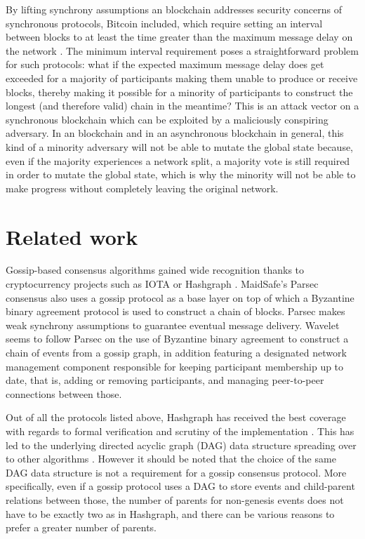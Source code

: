 \documentclass[a4paper,11pt]{article}
\begin{document}
By lifting synchrony assumptions an blockchain addresses security concerns of synchronous
protocols, Bitcoin included, which require setting an interval between blocks to at least the time
greater than the maximum message delay on the network \cite{rethinking}. The minimum interval
requirement poses a straightforward problem for such protocols: what if the expected maximum message
delay does get exceeded for a majority of participants making them unable to produce or receive
blocks, thereby making it possible for a minority of participants to construct the longest (and
therefore valid) chain in the meantime? This is an attack vector on a synchronous blockchain which
can be exploited by a maliciously conspiring adversary. In an blockchain and in an
asynchronous blockchain in general, this kind of a minority adversary will not be able to mutate the
global state because, even if the majority experiences a network split, a majority vote is still
required in order to mutate the global state, which is why the minority will not be able to make
progress without completely leaving the original network.


\section{Related work}

Gossip-based consensus algorithms gained wide recognition thanks to cryptocurrency projects such as
IOTA or Hashgraph \cite{hashgraph}. MaidSafe's Parsec \cite{parsec} consensus also uses a gossip
protocol as a base layer on top of which a Byzantine binary agreement protocol is used to construct
a chain of blocks. Parsec makes weak synchrony assumptions to guarantee eventual message
delivery. Wavelet \cite{wavelet} seems to follow Parsec on the use of Byzantine binary agreement to
construct a chain of events from a gossip graph, in addition featuring a designated network
management component responsible for keeping participant membership up to date, that is, adding or
removing participants, and managing peer-to-peer connections between those.

Out of all the protocols listed above, Hashgraph has received the best coverage with regards to
formal verification \cite{hashgraph-coq} and scrutiny of the implementation
\cite{hashgraph-fud}. This has led to the underlying directed acyclic graph (DAG) data structure
spreading over to other algorithms \cite{parsec, lachesis}. However it should be noted that the
choice of the same DAG data structure is not a requirement for a gossip consensus protocol. More
specifically, even if a gossip protocol uses a DAG to store events and child-parent relations
between those, the number of parents for non-genesis events does not have to be exactly two as in
Hashgraph, and there can be various reasons to prefer a greater number of parents.
\end{document}
